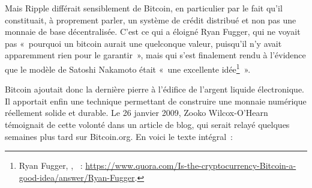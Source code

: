 Mais Ripple différait sensiblement de Bitcoin, en particulier par le fait qu'il constituait, à proprement parler, un système de crédit distribué et non pas une monnaie de base décentralisée. C'est ce qui a éloigné Ryan Fugger, qui ne voyait pas «~pourquoi un bitcoin aurait une quelconque valeur, puisqu'il n'y avait apparemment rien pour le garantir~», mais qui s'est finalement rendu à l'évidence que le modèle de Satoshi Nakamoto était «~une excellente idée\footnote{Ryan Fugger, , ~: \url{https://www.quora.com/Is-the-cryptocurrency-Bitcoin-a-good-idea/answer/Ryan-Fugger}.}~».

Bitcoin ajoutait donc la dernière pierre à l'édifice de l'argent liquide électronique. Il apportait enfin une technique permettant de construire une monnaie numérique réellement solide et durable. Le 26 janvier 2009, Zooko Wilcox-O'Hearn témoignait de cette volonté dans un article de blog, qui serait relayé quelques semaines plus tard sur Bitcoin.org. En voici le texte intégral~:

